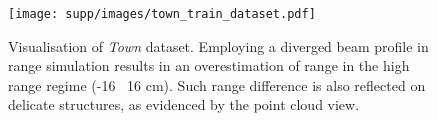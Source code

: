 \begin{figure}[t]
\centering
\texttt{[image: supp/images/town\_train\_dataset.pdf]}

\caption{Visualisation of \textit{Town} dataset. Employing a diverged beam profile in range simulation results in an overestimation of range in the high range regime (-16 \bwr~16 cm). Such range difference is also reflected on delicate structures, as evidenced by the point cloud view.}
\label{fig:supp_town_dataset}

\end{figure}
